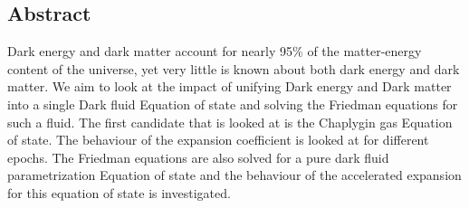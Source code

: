 \documentclass[a4paper, 11pt]{FSKH_623_Report}
\numberwithin{equation}{section}
\begin{document}
\pagebreak
\subsection*{Abstract}
Dark energy and dark matter account for nearly 95\% of the matter-energy content of the universe, yet very little is known about both dark energy and dark matter. We aim to look at the impact of unifying Dark energy and Dark matter into a single Dark fluid Equation of state and solving the Friedman equations for such a fluid. The first candidate that is looked at is the Chaplygin gas Equation of state. The behaviour of the expansion coefficient is looked at for different epochs. The Friedman equations are also solved for a pure dark fluid parametrization Equation of state and the behaviour of the accelerated expansion for this equation of state is investigated. 


%                               
                               
 
\pagebreak

%
\end{document}
